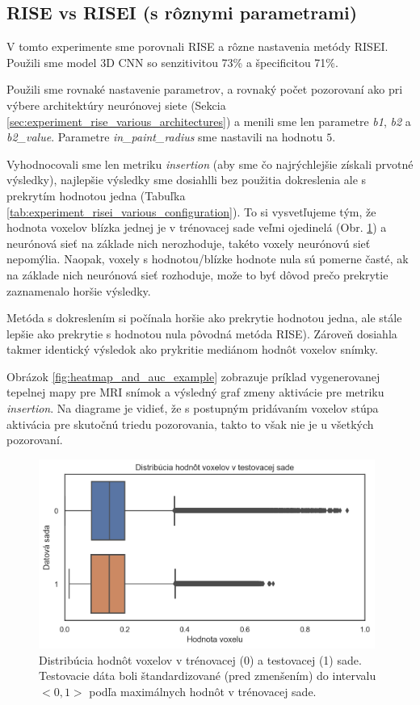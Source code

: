 \subsection{RISE vs RISEI (s rôznymi parametrami)}

V tomto experimente sme porovnali RISE a rôzne nastavenia metódy RISEI. Použili sme model 3D CNN so senzitivitou 73\% a špecificitou 71\%.

Použili sme rovnaké nastavenie parametrov, a rovnaký počet pozorovaní ako pri výbere architektúry neurónovej siete (Sekcia \ref{sec:experiment_rise_various_architectures}) a menili sme len parametre \textit{b1}, \textit{b2} a \textit{b2\_value}. Parametre \textit{in\_paint\_radius} sme nastavili na hodnotu $5$. 

Vyhodnocovali sme len metriku \textit{insertion} (aby sme čo najrýchlejšie získali prvotné výsledky), najlepšie výsledky sme dosiahlli bez použitia dokreslenia ale s prekrytím hodnotou jedna (Tabuľka \ref{tab:experiment_risei_various_configuration}). To si vysvetľujeme tým, že hodnota voxelov blízka jednej je v trénovacej sade veľmi ojedinelá (Obr. \ref{fig:test_dataset_voxel_distribution}) a neurónová sieť na základe nich nerozhoduje, takéto voxely neurónovú sieť nepomýlia. Naopak, voxely s hodnotou/blízke hodnote nula sú pomerne časté, ak na základe nich neurónová sieť rozhoduje, može to byť dôvod prečo prekrytie zaznamenalo horšie výsledky.

Metóda s dokreslením si počínala horšie ako prekrytie hodnotou jedna, ale stále lepšie ako prekrytie s hodnotou nula pôvodná metóda RISE). Zároveň dosiahla takmer identický výsledok ako prykritie mediánom hodnôt voxelov snímky.

Obrázok \ref{fig:heatmap_and_auc_example} zobrazuje príklad vygenerovanej tepelnej mapy pre MRI snímok a výsledný graf zmeny aktivácie pre metriku \textit{insertion}. Na diagrame je vidieť, že s postupným pridávaním voxelov stúpa aktivácia pre skutočnú triedu pozorovania, takto to však nie je u všetkých pozorovaní.

\begin{figure}[h!]
    \centering
    \includegraphics[width=11cm]{assets/images/test_dataset_voxel_distribution.png}
    \caption{Distribúcia hodnôt voxelov v trénovacej (0) a testovacej (1) sade. Testovacie dáta boli štandardizované (pred zmenšením) do intervalu $<0, 1>$ podľa maximálnych hodnôt v trénovacej sade.}
    \label{fig:test_dataset_voxel_distribution}
\end{figure}

